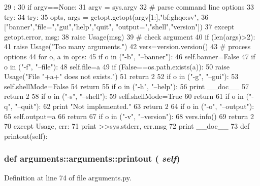 \begin{DoxyCode}
29                           :
30         if argv==None:
31                 argv = sys.argv
32         # parse command line options
33         try:
34             try:
35                 opts, args = getopt.getopt(argv[1:],"bf:ghqo:sv",
36                                            ["banner","file=","gui","help","quit",
      "output=","shell","version"])
37             except getopt.error, msg:
38                 raise Usage(msg)
39             # check argument
40             if (len(args)>2):
41                 raise Usage("Too many arguments.")
42             vers=version.version()
43             # process options
44             for o, a in opts:
45                 if o in ("-b", "--banner"):
46                     self.banner=False
47                 if o in ("-f", "--file"):
48                     self.file=a
49                     if (False==os.path.exists(a)):
50                         raise Usage("File "+a+" does not exists.")
51                         return 2
52                 if o in ("-g", "--gui"):
53                     self.shellMode=False
54                     return
55                 if o in ("-h", "--help"):
56                     print __doc__
57                     return 2
58                 if o in ("-s", "--shell"):
59                     self.shellMode=True
60                     return
61                 if o in ("-q", "--quit"):
62                     print "Not implemented."
63                     return 2
64                 if o in ("-o", "--output"):
65                     self.output=a
66                     return
67                 if o in ("-v", "--version"):
68                     vers.info()
69                     return 2
70         except Usage, err:
71             print >>sys.stderr, err.msg
72             print __doc__
73 
    def printout(self):
\end{DoxyCode}
\hypertarget{classarguments_1_1arguments_a7f17a7f2e7b18b5dbb4832ca4da325c2}{
\subsubsection[{printout}]{\setlength{\rightskip}{0pt plus 5cm}def arguments::arguments::printout ( {\em self})}}
\label{classarguments_1_1arguments_a7f17a7f2e7b18b5dbb4832ca4da325c2}


Definition at line 74 of file arguments.py.


